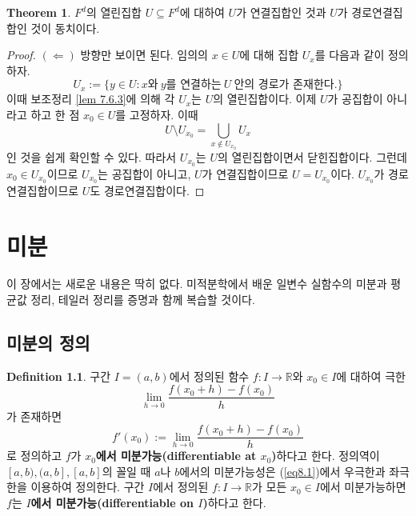\documentclass[11pt]{book}
\numberwithin{equation}{chapter}
\def\RR{\mathbb{R}}
\theoremstyle{definition}
\newtheorem{thm}{Theorem}[section]
\newtheorem{defn}[thm]{Definition}
\begin{document}
\begin{thm}
    \(F^d\)의 열린집합 \(U \subseteq F^d\)에 대하여 \(U\)가 연결집합인 것과 \(U\)가 경로연결집합인 것이 동치이다.
\end{thm}
\begin{proof}
    \((\Leftarrow)\) 방향만 보이면 된다. 임의의 \(x \in U\)에 대해 집합 \(U_x\)를 다음과 같이 정의하자.
    \[
      U_x := \{y \in U : x\text{와} \ y\text{를 연결하는} \ U \ \text{안의 경로가 존재한다.}\}  
    \]
    이때 보조정리 \ref{lem 7.6.3}에 의해 각 \(U_x\)는 \(U\)의 열린집합이다. 이제 \(U\)가 공집합이 아니라고 하고 한 점 \(x_0 \in U\)를 고정하자. 이때
    \[
    U \setminus U_{x_0} = \bigcup_{x \notin U_{x_0}} U_x    
    \]
    인 것을 쉽게 확인할 수 있다. 따라서 \(U_{x_0}\)는 \(U\)의 열린집합이면서 닫힌집합이다. 그런데 \(x_0 \in U_{x_0}\)이므로 \(U_{x_0}\)는 공집합이 아니고, \(U\)가 연결집합이므로 \(U = U_{x_0}\)이다. \(U_{x_0}\)가 경로연결집합이므로 \(U\)도 경로연결집합이다.
\end{proof}



\chapter{미분}

이 장에서는 새로운 내용은 딱히 없다. 미적분학에서 배운 일변수 실함수의 미분과 평균값 정리, 테일러 정리를 증명과 함께 복습할 것이다.

\section{미분의 정의}

\begin{defn}
    구간 \(I = (a, b)\)에서 정의된 함수 \(f : I \to \RR\)와 \(x_0 \in I\)에 대하여 극한
    \[
        \lim_{h \to 0} \frac{f(x_0+h) - f(x_0)}{h} 
    \]
    가 존재하면
    \begin{equation}\label{eq8.1}
        f'(x_0) := \lim_{h \to 0} \frac{f(x_0+h) - f(x_0)}{h} 
    \end{equation}
    로 정의하고 \(f\)가 \textbf{\(x_0\)에서 미분가능(differentiable at \(x_0\))}하다고 한다. 정의역이 \([a, b), (a, b], [a, b]\)의 꼴일 때 \(a\)나 \(b\)에서의 미분가능성은 (\ref{eq8.1})에서 우극한과 좌극한을 이용하여 정의한다. 구간 \(I\)에서 정의된 \(f : I \to \RR\)가 모든 \(x_0 \in I\)에서 미분가능하면 \(f\)는 \textbf{\(I\)에서 미분가능(differentiable on \(I\))}하다고 한다.
\end{defn}
\end{document}
